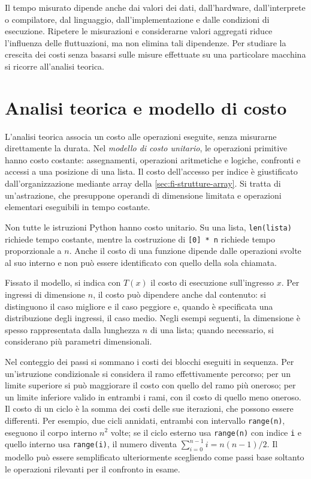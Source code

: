 Il tempo misurato dipende anche dai valori dei dati, dall'hardware,
dall'interprete o compilatore, dal linguaggio, dall'implementazione e
dalle condizioni di esecuzione. Ripetere le misurazioni e considerarne valori aggregati
riduce l'influenza delle fluttuazioni, ma non elimina tali dipendenze.
Per studiare la crescita dei costi senza basarsi sulle misure
effettuate su una particolare macchina si ricorre all'analisi teorica.

\section{Analisi teorica e modello di costo}
\label{sec:fi-complessita-modello}

L'analisi teorica associa un costo alle operazioni eseguite, senza
misurarne direttamente la durata. Nel \emph{modello di costo unitario},
le operazioni primitive hanno costo costante: assegnamenti,
operazioni aritmetiche e logiche, confronti e accessi a una posizione
di una lista. Il costo dell'accesso per indice è giustificato
dall'organizzazione mediante array della \cref{sec:fi-strutture-array}.
Si tratta di un'astrazione, che presuppone operandi di
dimensione limitata e operazioni elementari eseguibili in tempo
costante.

Non tutte le istruzioni Python hanno costo unitario. Su una lista,
\texttt{len(lista)} richiede tempo costante, mentre la costruzione di
\texttt{[0] * n} richiede tempo proporzionale a \(n\). Anche il costo
di una funzione dipende dalle operazioni svolte al suo interno e non
può essere identificato con quello della sola chiamata.

Fissato il modello, si indica con \(T(x)\) il costo di esecuzione
sull'ingresso \(x\). Per ingressi di dimensione \(n\), il costo può
dipendere anche dal contenuto: si distinguono il caso migliore e il
caso peggiore e, quando è specificata una distribuzione degli ingressi,
il caso medio. Negli esempi seguenti, la dimensione è spesso
rappresentata dalla lunghezza \(n\) di una lista; quando necessario,
si considerano più parametri dimensionali.

Nel conteggio dei passi si sommano i costi dei blocchi eseguiti in
sequenza. Per un'istruzione condizionale si considera il ramo
effettivamente percorso; per un limite superiore si può maggiorare
il costo con quello del ramo più oneroso; per un limite inferiore
valido in entrambi i rami, con il costo di quello meno oneroso.
Il costo di un ciclo è la somma dei costi delle sue iterazioni,
che possono essere differenti. Per esempio, due cicli annidati,
entrambi con intervallo \texttt{range(n)}, eseguono il corpo interno
\(n^2\) volte; se il ciclo esterno usa \texttt{range(n)} con indice
\texttt{i} e quello interno usa \texttt{range(i)}, il numero diventa
\(\sum_{i=0}^{n-1}i=n(n-1)/2\).
Il modello può essere semplificato ulteriormente scegliendo come passi
base soltanto le operazioni rilevanti per il confronto in esame.

